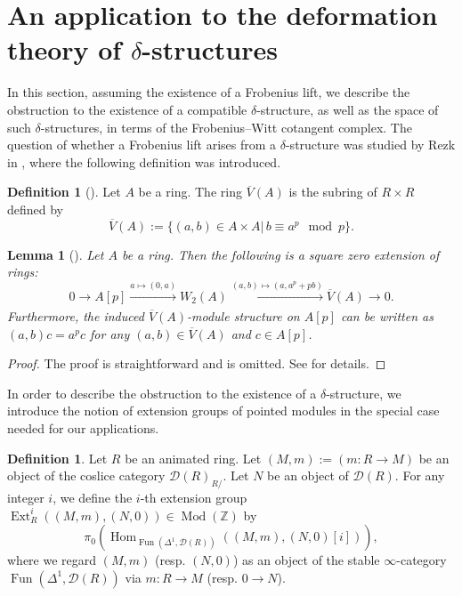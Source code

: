 \documentclass[11pt, a4paper]{amsart}
\theoremstyle{plain}
\newtheorem{lemma}[theorem]{Lemma}
\theoremstyle{definition}
\newtheorem{definition}[theorem]{Definition}
\begin{document}
\section{An application to the deformation theory of $\delta$-structures}
In this section, assuming the existence of a Frobenius lift, we describe the obstruction to the existence of a compatible $\delta$-structure, as well as the space of such $\delta$-structures, in terms of the Frobenius--Witt cotangent complex. The question of whether a Frobenius lift arises from a $\delta$-structure was studied by Rezk in \cite{Rez19}, where the following definition was introduced.
\begin{definition}[\cite{Rez19}]
Let $A$ be a ring. The ring $\overline{V}(A)$ is the subring of $R\times R$ defined by \[\overline V(A):=\{(a,b)\in A\times A|\, b\equiv a^p\mod p\}.\]
\end{definition}

\begin{lemma}[\cite{Rez19}]\label{D.1}
    Let $A$ be a ring. Then the following is a square zero extension of rings:
    \[0\to A[p]\xrightarrow[]{a\mapsto (0,a)} W_2(A)\xrightarrow[]{(a,b)\mapsto (a,a^p+pb)}\overline V(A)\to 0.\]
    Furthermore, the induced $\overline V(A)$-module structure on $A[p]$ can be written as $(a,b)c=a^pc$ for any $(a,b)\in \overline{V}(A)$ and $c\in A[p]$.
\end{lemma}
\begin{proof}
    The proof is straightforward and is omitted. See \cite[Proposition 3.2]{Rez19} for details.
\end{proof}
In order to describe the obstruction to the existence of a $\delta$-structure, we introduce the notion of extension groups of pointed modules in the special case needed for our applications.

\begin{definition}
    Let $R$ be an animated ring. Let $(M,m):=(m:R\to M)$ be an object of the coslice category $\mathcal D(R)_{R/}$. Let $N$ be an object of $\mathcal{D}(R)$. For any integer $i$, we define the $i$-th extension group $\operatorname{Ext}^i_R((M,m),(N,0))\in \operatorname{Mod}(\mathbb Z)$ by \[\pi_0(\operatorname{Hom}_{\operatorname{Fun}(\Delta^1,\mathcal D(R))}((M,m),(N,0)[i])),\] where we regard $(M,m)$ (resp. $(N,0)$) as an object of the stable $\infty$-category $\operatorname{Fun}(\Delta^1,\mathcal{D}(R))$ via $m:R\to M$ (resp. $0\to N$).
\end{definition}
\end{document}
